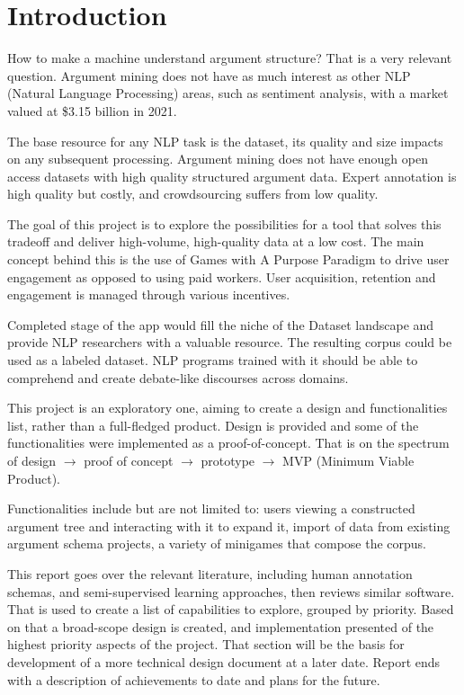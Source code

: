 \documentclass{report}
\begin{document}
\tableofcontents

\newpage

\chapter{Introduction}
How to make a machine understand argument structure?
That is a very relevant question. Argument mining does not have as much interest as other NLP (Natural Language Processing) areas, such as sentiment analysis, with a market valued at \$3.15 billion in 2021. \cite{noauthor_sentiment_nodate}

The base resource for any NLP task is the dataset, its quality and size impacts on any subsequent processing. Argument mining does not have enough open access datasets with high quality structured argument data.  Expert annotation is high quality but costly, and crowdsourcing suffers from low quality. 

The goal of this project is to explore the possibilities for a tool that solves this tradeoff and deliver high-volume, high-quality data at a low cost. 
The main concept behind this is the use of Games with A Purpose Paradigm to drive user engagement as opposed to using paid workers. User acquisition, retention and engagement is managed through various incentives. 

Completed stage of the app would fill the niche of the Dataset landscape and provide NLP researchers with a valuable resource.
The resulting corpus could be used as a labeled dataset. NLP programs trained with it should be able to comprehend and create debate-like discourses across domains.

This project is an exploratory one, aiming to create a design and functionalities list, rather than a full-fledged product.
Design is provided and some of the functionalities were implemented as a proof-of-concept. 
That is on the spectrum of design $\rightarrow$ proof of concept $\rightarrow$ prototype $\rightarrow$ MVP (Minimum Viable Product).

Functionalities include but are not limited to: users viewing a constructed argument tree and interacting with it to expand it, import of data from existing argument schema projects, a variety of minigames that compose the corpus. 

This report goes over the relevant literature, including human annotation schemas, and semi-supervised learning approaches, then reviews similar software. That is used to create a list of capabilities to explore, grouped by priority. Based on that a broad-scope design is created, and implementation presented of the highest priority aspects of the project.
That section will be the basis for development of a more technical design document at a later date.
Report ends with a description of achievements to date and plans for the future.
\end{document}

